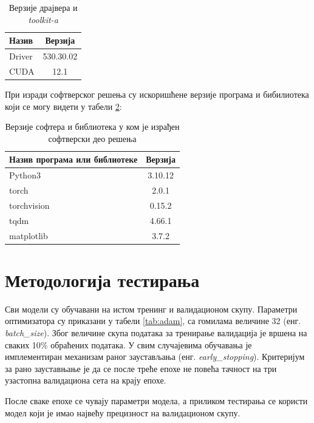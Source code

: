 \documentclass[a4paper, 12pt, master, utf8]{etf}
\begin{document}
\begin{table}[h]
    \centering
    \begin{tabular}{l | c}
    \hline
    Назив & Верзија\\
    \hline
        Driver & 530.30.02\\
        CUDA & 12.1 \\
    \end{tabular}
    \caption{Верзије драјвера и \textit{toolkit-a}}
    \label{tab:hw}
\end{table}

При изради софтверског решења су искоришћене верзије програма и бибилиотека који се могу видети у табели \ref{tab:sw}:
\newline

\begin{table}[h]
    \centering
    \begin{tabular}{l | c}
    \hline
    Назив програма или библиотеке & Верзија\\
    \hline
        Python3 & 3.10.12\\
        torch & 2.0.1\\
        torchvision & 0.15.2\\
        tqdm & 4.66.1\\
        matplotlib & 3.7.2
    \end{tabular}
    \caption{Верзије софтера и библиотека у ком је израђен софтверски део решења}
    \label{tab:sw}
\end{table}

\section{Методологија тестирања}
\label{sec:52}

Сви модели су обучавани на истом тренинг и валидационом скупу. Параметри оптимизатора су приказани у табели \ref{tab:adam}, са гомилама величине 32 (енг. \textit{batch\_size}).
Због величине скупа података за тренирање валидација је вршена на сваких 10\% обраћених података.
У свим случајевима обучавања је имплементиран механизам раног заустављања (енг. \textit{early\_stopping}). Критеријум за рано зауставњање је да се после треће епохе не повећа 
тачност на три узастопна валидациона сета на крају епохе.
\newline

После сваке епохе се чувају параметри модела, а приликом тестирања се користи модел који је имао највећу прецизност на валидационом скупу.
\newline
\end{document}
